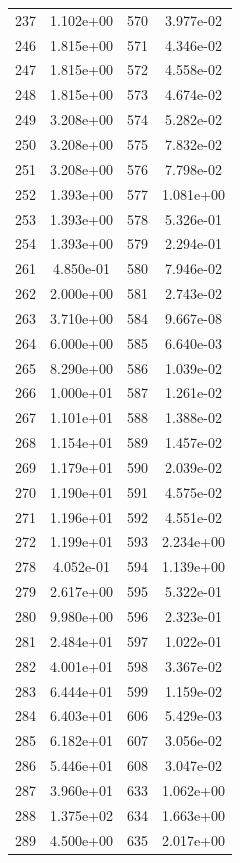 \documentclass[12pt]{article}
\begin{document}
\begin{longtable}{@{}cccc@{}}
237 & 1.102e+00 & 570 & 3.977e-02 \\
246 & 1.815e+00 & 571 & 4.346e-02 \\
247 & 1.815e+00 & 572 & 4.558e-02 \\
248 & 1.815e+00 & 573 & 4.674e-02 \\
249 & 3.208e+00 & 574 & 5.282e-02 \\
250 & 3.208e+00 & 575 & 7.832e-02 \\
251 & 3.208e+00 & 576 & 7.798e-02 \\
252 & 1.393e+00 & 577 & 1.081e+00 \\
253 & 1.393e+00 & 578 & 5.326e-01 \\
254 & 1.393e+00 & 579 & 2.294e-01 \\
261 & 4.850e-01 & 580 & 7.946e-02 \\
262 & 2.000e+00 & 581 & 2.743e-02 \\
263 & 3.710e+00 & 584 & 9.667e-08 \\
264 & 6.000e+00 & 585 & 6.640e-03 \\
265 & 8.290e+00 & 586 & 1.039e-02 \\
266 & 1.000e+01 & 587 & 1.261e-02 \\
267 & 1.101e+01 & 588 & 1.388e-02 \\
268 & 1.154e+01 & 589 & 1.457e-02 \\
269 & 1.179e+01 & 590 & 2.039e-02 \\
270 & 1.190e+01 & 591 & 4.575e-02 \\
271 & 1.196e+01 & 592 & 4.551e-02 \\
272 & 1.199e+01 & 593 & 2.234e+00 \\
278 & 4.052e-01 & 594 & 1.139e+00 \\
279 & 2.617e+00 & 595 & 5.322e-01 \\
280 & 9.980e+00 & 596 & 2.323e-01 \\
281 & 2.484e+01 & 597 & 1.022e-01 \\
282 & 4.001e+01 & 598 & 3.367e-02 \\
283 & 6.444e+01 & 599 & 1.159e-02 \\
284 & 6.403e+01 & 606 & 5.429e-03 \\
285 & 6.182e+01 & 607 & 3.056e-02 \\
286 & 5.446e+01 & 608 & 3.047e-02 \\
287 & 3.960e+01 & 633 & 1.062e+00 \\
288 & 1.375e+02 & 634 & 1.663e+00 \\
289 & 4.500e+00 & 635 & 2.017e+00 \\

\end{longtable}
\end{document}
